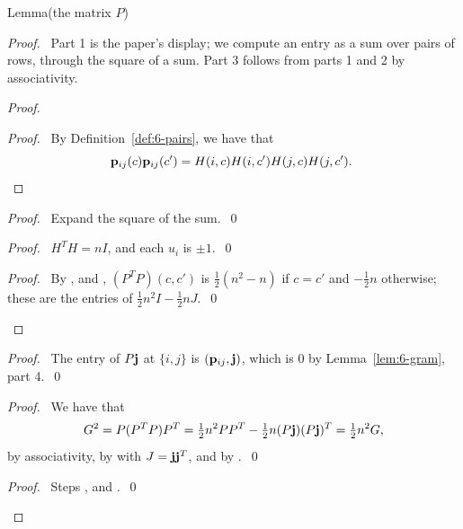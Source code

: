 \begin{namedresult}{Lemma}{(the matrix $P$)}\label{lem:6-P}
\end{namedresult}
\begin{proof}
 \pfsketch\ Part 1 is the paper's display; we compute an entry as a sum over pairs of rows,
 through the square of a sum. Part 3 follows from parts 1 and 2 by associativity.
 \begin{proof}
  \begin{proof}\pf\ By Definition~\ref{def:6-pairs}, we have that
   \[{\mathbf p}_{ij}(c){\mathbf p}_{ij}(c')=H(i,c)H(i,c')H(j,c)H(j,c').~\relax\]
  \end{proof}
  \begin{proof}\pf\ Expand the square of the sum.~\qed\end{proof}
  \begin{proof}\pf\ $H^TH=nI$, and each $u_i$ is $\pm1$.~\qed\end{proof}
  \qedstep
  \begin{proof}\pf\ By ,  and ,
   $(P^TP)(c,c')$ is $\frac12(n^2-n)$ if $c=c'$ and $-\frac12n$ otherwise; these are the entries
   of $\frac12n^2I-\frac12nJ$.~\qed\end{proof}
 \end{proof}
 \begin{proof}\pf\ The entry of $P{\mathbf j}$ at $\{i,j\}$ is $({\mathbf p}_{ij},{\mathbf j})$, which is 0 by
  Lemma~\ref{lem:6-gram}, part 4.~\qed\end{proof}
 \begin{proof}\pf\ We have that
  \[
   G^2=P(P^TP)P^T=\tfrac12n^2PP^T-\tfrac12n(P{\mathbf j})(P{\mathbf j})^T=\tfrac12n^2G,
  \]
  by associativity, by  with $J={\mathbf j}{\mathbf j}^T$, and by .~\qed
 \end{proof}
 \qedstep
 \begin{proof}\pf\ Steps ,  and .~\qed\end{proof}
\end{proof}

